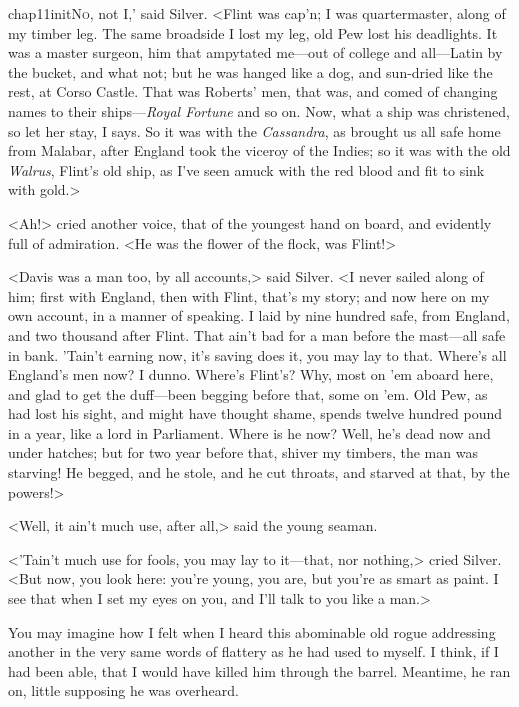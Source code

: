 
\lettrine[ante=`,image=true,findent=2pt]{chap11initN}{o}, not I,' said Silver. <Flint was cap'n; I was quartermaster, along of my timber leg. The same broadside I lost my leg, old Pew lost his deadlights. It was a master surgeon, him that ampytated me—out of college and all—Latin by the bucket, and what not; but he was hanged like a dog, and sun-dried like the rest, at Corso Castle. That was Roberts' men, that was, and comed of changing names to their ships—\textit{Royal Fortune} and so on. Now, what a ship was christened, so let her stay, I says. So it was with the \textit{Cassandra}, as brought us all safe home from Malabar, after England took the viceroy of the Indies; so it was with the old \textit{Walrus}, Flint's old ship, as I've seen amuck with the red blood and fit to sink with gold.>

<Ah!> cried another voice, that of the youngest hand on board, and evidently full of admiration. <He was the flower of the flock, was Flint!>

<Davis was a man too, by all accounts,> said Silver. <I never sailed along of him; first with England, then with Flint, that's my story; and now here on my own account, in a manner of speaking. I laid by nine hundred safe, from England, and two thousand after Flint. That ain't bad for a man before the mast—all safe in bank. 'Tain't earning now, it's saving does it, you may lay to that. Where's all England's men now? I dunno. Where's Flint's? Why, most on 'em aboard here, and glad to get the duff—been begging before that, some on 'em. Old Pew, as had lost his sight, and might have thought shame, spends twelve hundred pound in a year, like a lord in Parliament. Where is he now? Well, he's dead now and under hatches; but for two year before that, shiver my timbers, the man was starving! He begged, and he stole, and he cut throats, and starved at that, by the powers!>

<Well, it ain't much use, after all,> said the young seaman.

<'Tain't much use for fools, you may lay to it—that, nor nothing,> cried Silver. <But now, you look here: you're young, you are, but you're as smart as paint. I see that when I set my eyes on you, and I'll talk to you like a man.>

You may imagine how I felt when I heard this abominable old rogue addressing another in the very same words of flattery as he had used to myself. I think, if I had been able, that I would have killed him through the barrel. Meantime, he ran on, little supposing he was overheard.

